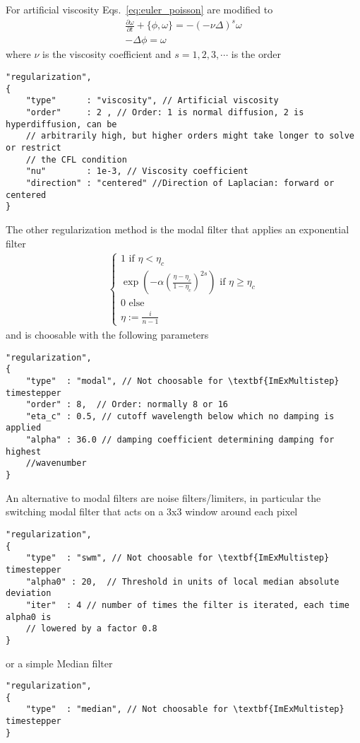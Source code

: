 For artificial viscosity Eqs.~\eqref{eq:euler_poisson} are modified to
\begin{subequations}
\begin{align}
    \frac{\partial \omega}{\partial t} + \{ \phi, \omega\} = -(-\nu \Delta)^s \omega\\
 -\Delta \phi = \omega
\end{align}
\label{eq:euler_poisson_viscous}
\end{subequations}
where $\nu$ is the viscosity coefficient and $s=1,2,3,\cdots$ is the order
\begin{verbatim}
"regularization",
{
    "type"      : "viscosity", // Artificial viscosity
    "order"     : 2 , // Order: 1 is normal diffusion, 2 is hyperdiffusion, can be
    // arbitrarily high, but higher orders might take longer to solve or restrict
    // the CFL condition
    "nu"        : 1e-3, // Viscosity coefficient
    "direction" : "centered" //Direction of Laplacian: forward or centered
}
\end{verbatim}
The other regularization method is the modal filter that applies an exponential filter
\begin{align}
    \begin{cases}
    1 \text{ if } \eta < \eta_c \\
    \exp\left( -\alpha  \left(\frac{\eta-\eta_c}{1-\eta_c} \right)^{2s}\right) \text { if } \eta \geq \eta_c \\
    0 \text{ else} \\
    \eta := \frac{i}{n-1}
    \end{cases}
\end{align}
and is choosable with the following parameters
\begin{verbatim}
"regularization",
{
    "type"  : "modal", // Not choosable for \textbf{ImExMultistep} timestepper
    "order" : 8,  // Order: normally 8 or 16
    "eta_c" : 0.5, // cutoff wavelength below which no damping is applied
    "alpha" : 36.0 // damping coefficient determining damping for highest
    //wavenumber
}
\end{verbatim}
An alternative to modal filters are noise filters/limiters, in particular the
switching modal filter that acts on a 3x3 window around each pixel
\begin{verbatim}
"regularization",
{
    "type"  : "swm", // Not choosable for \textbf{ImExMultistep} timestepper
    "alpha0" : 20,  // Threshold in units of local median absolute deviation
    "iter"  : 4 // number of times the filter is iterated, each time alpha0 is
    // lowered by a factor 0.8
}
\end{verbatim}
or a simple Median filter
\begin{verbatim}
"regularization",
{
    "type"  : "median", // Not choosable for \textbf{ImExMultistep} timestepper
}
\end{verbatim}

